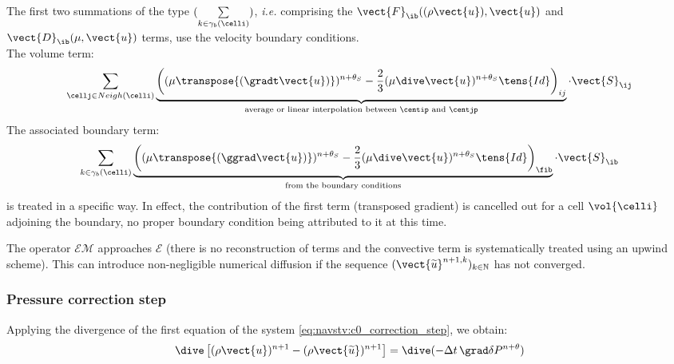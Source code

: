 \begin{remark}
The first two summations of the type $(\sum\limits_{k\in {\gamma_b(\celli)}})$,
\emph{i.e.} comprising the $\vect{F}_{\ib}((\rho \vect{u}),\vect{u})$ and
$\vect{D}_{\ib}(\mu,\vect{u})$ terms, use the velocity boundary conditions.\\
The volume term:
\begin{equation*}
\sum\limits_{\cellj \in Neigh(\celli)}{ \underbrace{\left((\mu \transpose{\left(\gradt\vect{u}\right)} )^{n+\theta_{S}}- \frac{2}{3} ( \mu  \dive \vect{u})^{n+\theta_{S}}\tens{Id}\right)_{ij}}_{\text{average or linear interpolation between $\centip$ and $\centjp$}} \cdot \vect{S}_{\ij}}\\
\end{equation*}
The associated boundary term:
\begin{equation*}
\sum\limits_{k\in {\gamma_b(\celli)}}{ \underbrace{\left((\mu \transpose{\left(\ggrad\vect{u}\right)})^{n+\theta_{S}}- \frac{2}{3} ( \mu  \dive \vect{u})^{n+\theta_{S}}\tens{Id}\right)_{\fib}}_\text{from the boundary conditions} \cdot \vect{S}_{\ib}}
\end{equation*}
is treated in a specific way. In effect, the contribution of the first term
(transposed gradient) is cancelled out for a cell $\vol{\celli}$ adjoining the
boundary, no proper boundary condition being attributed to it at this time.
\end{remark}

\begin{remark}
The operator $\mathcal{EM}$ approaches $\mathcal{E}$ (there is no reconstruction
of terms and the convective term is systematically treated using an upwind scheme).
This can introduce non-negligible numerical diffusion if the sequence
$(\vect{\widetilde{u}}^{n+1,k})_{k\in \mathbb{N}}$ has not converged.
\end{remark}

\subsubsection*{Pressure correction step}
Applying the divergence of the first equation of the system
\eqref{eq:navstv:c0_correction_step}, we obtain:
\begin{equation}
\dive\left[(\rho\vect{u})^{n+1}-(\rho\vect{\widetilde{u}})^{n+1}\right]
=\dive(-\Delta t\, \grad  \delta P^{n+\theta})
\end{equation}

